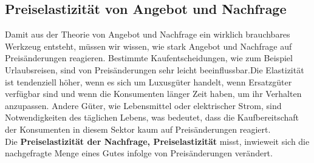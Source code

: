 \documentclass[10pt]{scrartcl}
\begin{document}
\subsection{Preiselastizität von Angebot und Nachfrage}
Damit aus der Theorie von Angebot und Nachfrage ein wirklich brauchbares Werkzeug entsteht, müssen wir wissen, wie stark Angebot und Nachfrage auf Preisänderungen reagieren. Bestimmte Kaufentscheidungen, wie zum Beispiel Urlaubsreisen, sind von Preisänderungen sehr leicht beeinflussbar.Die Elastizität ist tendenziell höher, wenn es sich um Luxusgüter handelt, wenn Ersatzgüter verfügbar sind und wenn die Konsumenten länger Zeit haben, um ihr Verhalten anzupassen. Andere Güter, wie Lebensmittel oder elektrischer Strom, sind Notwendigkeiten des täglichen Lebens, was bedeutet, dass die Kaufbereitschaft der Konsumenten in diesem Sektor kaum auf Preisänderungen reagiert.
\\
Die {\bf Preiselastizität der Nachfrage, Preiselastizität} misst, inwieweit sich die nachgefragte Menge eines Gutes infolge von Preisänderungen verändert.
\end{document}
